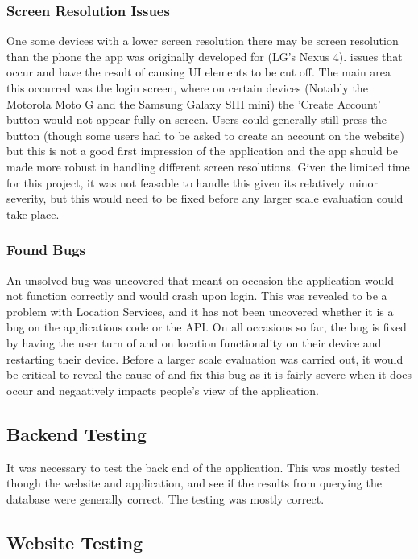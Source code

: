 \documentclass{l4proj}
\begin{document}
\subsubsection{Screen Resolution Issues}

One some devices with a lower screen resolution there may be screen resolution than the phone the app was originally developed for (LG's Nexus 4). issues that occur and have the result of causing UI elements to be cut off. The main area this occurred was the login screen, where on certain devices (Notably the Motorola Moto G and the Samsung Galaxy SIII mini) the 'Create Account' button would not appear fully on screen. Users could generally still press the button (though some users had to be asked to create an account on the website) but this is not a good first impression of the application and the app should be made more robust in handling different screen resolutions. Given the limited time for this project, it was not feasable to handle this given its relatively minor severity, but this would need to be fixed before any larger scale evaluation could take place.

\subsubsection{Found Bugs}

An unsolved bug was uncovered that meant on occasion the application would not function correctly and would crash upon login. This was revealed to be a problem with Location Services, and it has not been uncovered whether it is a bug on the applications code or the API. On all occasions so far, the bug is fixed by having the user turn of and on location functionality on their device and restarting their device. Before a larger scale evaluation was carried out, it would be critical to reveal the cause of and fix this bug as it is fairly severe when it does occur and negaatively impacts people's view of the application.

\subsection{Backend Testing}

It was necessary to test the back end of the application. This was mostly tested though the website and application, and see if the results from querying the database were generally correct. The testing was mostly correct.

\subsection{Website Testing}
\end{document}
